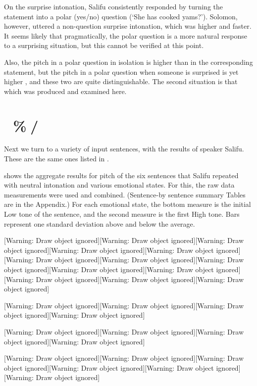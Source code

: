 \documentclass[output=paper]{langsci/langscibook}
\begin{document}
On the surprise intonation, Salifu consistently responded by turning the statement into a polar (yes/no) question (‘She has cooked yams?’). Solomon, however, uttered a non-question surprise intonation, which was higher and faster. It seems likely that pragmatically, the polar question is a more natural response to a surprising situation, but this cannot be verified at this point. 

Also, the pitch in a polar question in isolation is higher than in the corresponding statement, but the pitch in a polar question when someone is surprised is yet higher \citep{Cahill2012}, and these two are quite distinguishable. The second situation is that which was produced and examined here.

\section{ \%/}
\begin{styleBodyTextIndent}
Next we turn to a variety of input sentences, with the results of speaker Salifu. These are the same ones listed in .
\end{styleBodyTextIndent}

 shows the aggregate results for pitch of the six sentences that Salifu repeated with neutral intonation and various emotional states. For this, the raw data measurements were used and combined. (Sentence-by sentence summary Tables are in the Appendix.) For each emotional state, the bottom measure is the initial Low tone of the sentence, and the second measure is the first High tone. Bars represent one standard deviation above and below the average.

[Warning: Draw object ignored][Warning: Draw object ignored][Warning: Draw object ignored][Warning: Draw object ignored][Warning: Draw object ignored][Warning: Draw object ignored][Warning: Draw object ignored][Warning: Draw object ignored][Warning: Draw object ignored][Warning: Draw object ignored][Warning: Draw object ignored][Warning: Draw object ignored][Warning: Draw object ignored]

[Warning: Draw object ignored][Warning: Draw object ignored][Warning: Draw object ignored][Warning: Draw object ignored]

[Warning: Draw object ignored][Warning: Draw object ignored][Warning: Draw object ignored][Warning: Draw object ignored]

[Warning: Draw object ignored][Warning: Draw object ignored][Warning: Draw object ignored][Warning: Draw object ignored][Warning: Draw object ignored][Warning: Draw object ignored]
\end{document}
